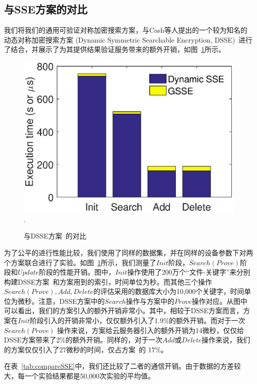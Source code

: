 \subsection{与SSE方案的对比}
我们将我们的通用可验证对称加密搜索方案\single ，与Cash等人提出的一个较为知名的动态对称加密搜索方案 (Dynamic Symmetric Searchable Encryption, DSSE)~\cite{cash2014dynamic}进行了结合，并展示了\single 为其提供结果验证服务带来的额外开销，如图~\ref{fig:comparison}所示。
\begin{figure}[h]
\centering
\includegraphics[width=3.5 in]{expr/comparison}
\DeclareGraphicsExtensions.
\caption{与DSSE方案~\cite{cash2014dynamic}的对比}
\label{fig:comparison}
\end{figure}
为了公平的进行性能比较，我们使用了同样的数据集，并在同样的设备参数下对两个方案联合进行了实验。如图~\ref{fig:comparison}所示，我们测量了$Init$阶段，$Search(Prove)$阶段和$Update$阶段的性能开销。图中，$Init$操作使用了200万个“文件-关键字”来分别构建DSSE方案~\cite{cash2014dynamic}和方案\single 用到的索引，时间单位为秒。而其他三个操作$Search(Prove), Add, Delete$的评估采用的数据库大小为10,000个关键字，时间单位为微秒。注意，DSSE方案中的$Search$操作与\single 方案中的$Prove$操作对应。从图中可以看出，我们的\single 方案引入的额外开销非常小。其中，相较于DSSE方案而言，方案\single 在$Init$阶段引入的开销非常小，仅仅额外引入了1.9\%的额外开销。而对于一次$Search(Prove)$ 操作来说，\single 方案给云服务器引入的额外开销为14微秒，仅仅给DSSE方案带来了2\%的额外开销。同样的，对于一次$Add$或$Delete$操作来说，我们的\single 方案仅仅引入了27微秒的时间，仅占方案~\cite{cash2014dynamic}的 17\%。

在表~\ref{tab:compareSSE}中，我们还比较了二者的通信开销。由于数据的方差较大，每一个实验结果都是50,000次实验的平均值。

